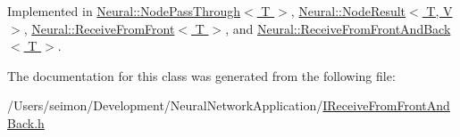 Implemented in \hyperlink{class_neural_1_1_node_pass_through_af138e9aa6b5de64431e0298b7622b790}{Neural::NodePassThrough$<$ T $>$}, \hyperlink{class_neural_1_1_node_result_afd1b253dbb0645b3ae0523ebd37b8d1e}{Neural::NodeResult$<$ T, V $>$}, \hyperlink{class_neural_1_1_receive_from_front_aa460db39ebf7cb6858ce070e9f988174}{Neural::ReceiveFromFront$<$ T $>$}, and \hyperlink{class_neural_1_1_receive_from_front_and_back_af483f1dfff9288b62c4324f973ca917b}{Neural::ReceiveFromFrontAndBack$<$ T $>$}.



The documentation for this class was generated from the following file:\begin{DoxyCompactItemize}
\item 
/Users/seimon/Development/NeuralNetworkApplication/\hyperlink{_i_receive_from_front_and_back_8h}{IReceiveFromFrontAndBack.h}\end{DoxyCompactItemize}
